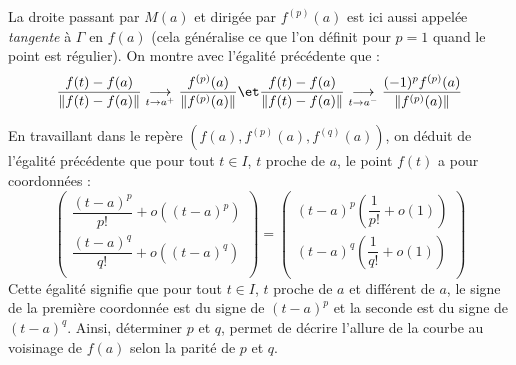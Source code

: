 \documentclass[a4paper,10pt]{report}
\begin{document}
\begin{rem} La droite passant par $M(a)$ et dirigée par $f^{(p)}(a)$ est ici aussi appelée \textit{tangente} à $\Gamma$ en $f(a)$ (cela généralise ce que l'on définit pour $p=1$ quand le point est régulier). On montre avec l'égalité précédente que :
$$ \dfrac{f(t)-f(a)}{\Vert f(t)-f(a) \Vert} \underset{t \rightarrow a^+}{\longrightarrow} \frac{f^{(p)}(a)}{\Vert f^{(p)}(a) \Vert} \et  \dfrac{f(t)-f(a)}{\Vert f(t)-f(a) \Vert} \underset{t \rightarrow a^-}{\longrightarrow} \frac{(-1)^p f^{(p)}(a)}{\Vert f^{(p)}(a) \Vert}$$
\end{rem}
En travaillant dans le repère $(f(a), f^{(p)}(a), f^{(q)}(a))$, on déduit de l'égalité précédente que pour tout $t \in I$, $t$ proche de $a$, le point $f(t)$ a pour coordonnées :
$$ \begin{pmatrix}
\dfrac{(t-a)^p}{p!}+o((t-a)^p) \\
\dfrac{(t-a)^q}{q!}+o((t-a)^q) \\
\end{pmatrix} = \begin{pmatrix}
(t-a)^p \left( \dfrac{1}{p!} + o(1) \right) \\
(t-a)^q \left( \dfrac{1}{q!} + o(1) \right) \\
\end{pmatrix}$$
Cette égalité signifie que pour tout $t \in I$, $t$ proche de $a$ et différent de $a$, le signe de la première coordonnée est du signe de $(t-a)^p$ et la seconde est du signe de $(t-a)^q$. Ainsi, déterminer $p$ et $q$, permet de décrire l'allure de la courbe au voisinage de $f(a)$ selon la parité de $p$ et $q$.

\newpage
\end{document}
